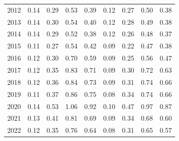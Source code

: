 \begin{tabular}{lcccccccc}
  2012 & 0.14 & 0.29 & 0.53 & 0.39 & 0.12 & 0.27 & 0.50 & 0.38 \\ 
  2013 & 0.14 & 0.30 & 0.54 & 0.40 & 0.12 & 0.28 & 0.49 & 0.38 \\ 
  2014 & 0.14 & 0.29 & 0.52 & 0.38 & 0.12 & 0.26 & 0.48 & 0.37 \\ 
  2015 & 0.11 & 0.27 & 0.54 & 0.42 & 0.09 & 0.22 & 0.47 & 0.38 \\ 
  2016 & 0.12 & 0.30 & 0.70 & 0.59 & 0.09 & 0.25 & 0.56 & 0.47 \\ 
  2017 & 0.12 & 0.35 & 0.83 & 0.71 & 0.09 & 0.30 & 0.72 & 0.63 \\ 
  2018 & 0.12 & 0.36 & 0.84 & 0.73 & 0.09 & 0.31 & 0.74 & 0.66 \\ 
  2019 & 0.11 & 0.37 & 0.86 & 0.75 & 0.08 & 0.34 & 0.74 & 0.66 \\ 
  2020 & 0.14 & 0.53 & 1.06 & 0.92 & 0.10 & 0.47 & 0.97 & 0.87 \\ 
  2021 & 0.13 & 0.41 & 0.81 & 0.69 & 0.09 & 0.34 & 0.68 & 0.60 \\ 
  2022 & 0.12 & 0.35 & 0.76 & 0.64 & 0.08 & 0.31 & 0.65 & 0.57 \\ 
   \bottomrule 
\end{tabular}
